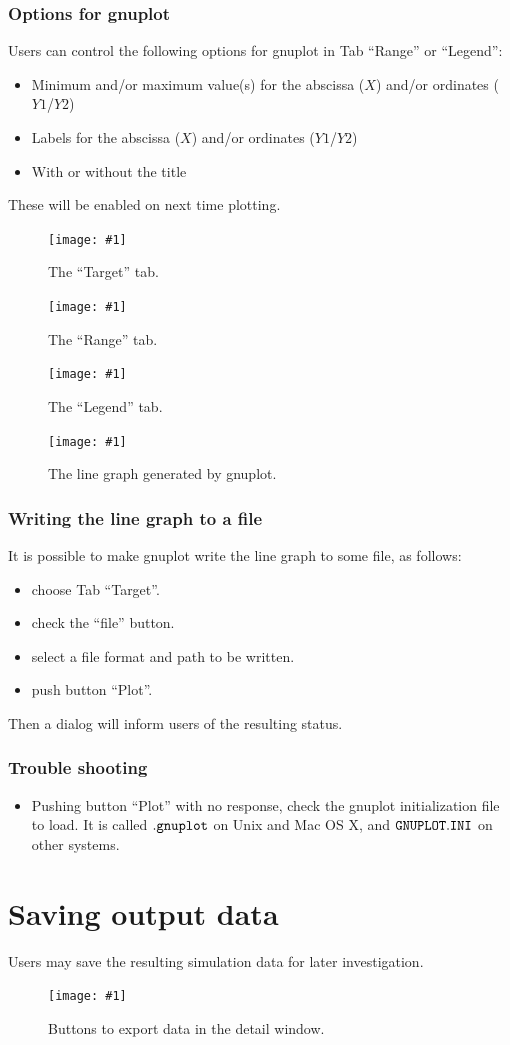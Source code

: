 \documentclass[a4paper,10pt]{report}
\newcommand\FigureOfImage[2]{\begin{figure}[h]
  \centering
  \texttt{[image: \#1]}
  \caption{#2}\label{fig:#1}
\end{figure}}
\begin{document}
\subsubsection{Options for gnuplot}
Users can control the following options for gnuplot in Tab ``Range'' or ``Legend'':
\begin{itemize}
\item Minimum and/or maximum value(s) for the abscissa ($X$) and/or ordinates ($Y1$/$Y2$)
\item Labels for the abscissa ($X$) and/or ordinates ($Y1$/$Y2$)
\item With or without the title
\end{itemize}
These will be enabled on next time plotting.
\FigureOfImage{lr-plot-target}{The ``Target'' tab.}
\FigureOfImage{lr-plot-range}{The ``Range'' tab.}
\FigureOfImage{lr-plot-legend}{The ``Legend'' tab.}
\FigureOfImage{lr-gnuplot}{The line graph generated by gnuplot.}

\subsubsection{Writing the line graph to a file}
It is possible to make gnuplot write the line graph to some file, as follows:
\begin{itemize}
\item choose Tab ``Target''.
\item check the ``file'' button.
\item select a file format and path to be written.
\item push button ``Plot''.
\end{itemize}
Then a dialog will inform users of the resulting status.

\subsubsection{Trouble shooting}
\begin{itemize}
\item Pushing button ``Plot'' with no response, check the gnuplot initialization
  file to load. It is called $\tt{.gnuplot}$ on Unix and Mac OS X, and
  $\tt{GNUPLOT.INI}$ on other systems.
\end{itemize}

\section{Saving output data}
Users may save the resulting simulation data for later investigation.
\FigureOfImage{lr-detail-buttons}{Buttons to export data in the detail window.}
\end{document}
